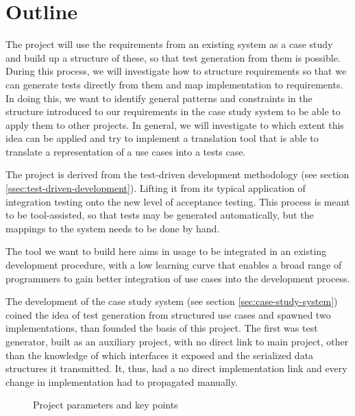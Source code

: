 \section{Outline}
\noindent The project will use the requirements from an existing system as a case study and build up a structure of these, so that test generation from them is possible. During this process, we will investigate how to structure requirements so that we can generate tests directly from them and map implementation to requirements. In doing this, we want to identify general patterns and constraints in the structure introduced to our requirements in the case study system to be able to apply them to other projects. In general, we will investigate to which extent this idea can be applied and try to implement a translation tool that is able to translate a representation of a use cases into a tests case.\medskip

\noindent The project is derived from the test-driven development methodology (see section \ref{ssec:test-driven-development}). Lifting it from its typical application of integration testing onto the new level of acceptance testing. This process is meant to be tool-assisted, so that tests may be generated automatically, but the mappings to the system needs to be done by hand.\medskip

\noindent The tool we want to build here aims in usage to be integrated in an existing development procedure, with a low learning curve that enables a broad range of programmers to gain better integration of use cases into the development process.\medskip

\noindent The development of the case study system (see section \ref{sec:case-study-system}) coined the idea of test generation from structured use cases and spawned two implementations, than founded the basis of this project. The first was test generator, built as an auxiliary project, with no direct link to main project, other than the knowledge of which interfaces it exposed and the serialized data structures it transmitted. It, thus, had a no direct implementation link and every change in implementation had to propagated manually.\medskip

\begin{figure}[!htbp]
\centering
{}
\caption{Project parameters and key points}
\label{fig:project_parameter_plot}
\end{figure}

